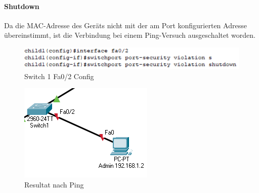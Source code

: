 \paragraph{Shutdown}
Da die MAC-Adresse des Geräts nicht mit der am Port konfigurierten Adresse übereinstimmt, ist die Verbindung bei einem Ping-Versuch ausgeschaltet worden.\\
\begin{figure}[!htb]
    \centering
    \includegraphics[width=.95\textwidth,keepaspectratio]{./img/config/security/shutdown/fa.png}
    \caption{Switch 1 Fa0/2 Config}
\end{figure}
\begin{figure}[!htb]
    \centering
    \includegraphics[width=.95\textwidth,height=.5\textwidth,keepaspectratio]{./img/config/security/shutdown/Result.png}
    \caption{Resultat nach Ping}
\end{figure}
\FloatBarrier

